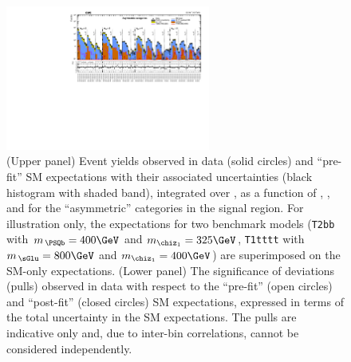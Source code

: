 \begin{figure}[!h]
  \begin{center}
    \includegraphics[angle=90,width=0.6\textwidth]{figures/result/v2/summaryPlot_Asymmetric_prefit_overlay_fit_b}
    \caption{(Upper panel) Event yields observed in data (solid circles)
      and ``pre-fit'' SM expectations with their associated
      uncertainties (black histogram with shaded band), integrated
      over \HTmiss, as a function of \njet, \nb, and \scalht for the
      ``asymmetric'' \njet categories in the signal region. For
      illustration only, the expectations for two benchmark models
      (\texttt{T2bb} with $m_{\,\PSQb} = 400\GeV$ and $m_{\chiz_1} =
      325\GeV$, \texttt{T1tttt} with $m_{\,\sGlu} = 800\GeV$ and
      $m_{\chiz_1} = 400\GeV$) are superimposed on the SM-only
      expectations. (Lower panel) The significance of deviations
      (pulls) observed in data with respect to the ``pre-fit'' (open
      circles) and ``post-fit'' (closed circles) SM expectations,
      expressed in terms of the total uncertainty in the SM
      expectations. The pulls are indicative only and, due to
      inter-bin correlations, cannot be considered independently.} 
    \label{fig:asym}
  \end{center}
\end{figure}

